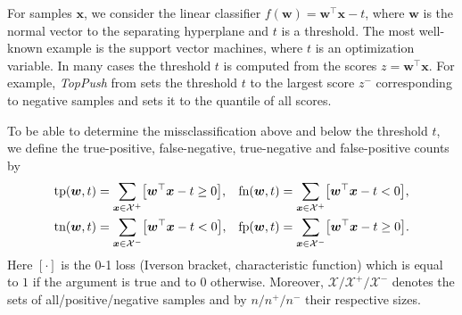 \documentclass[]{interact}
\theoremstyle{plain}%
\theoremstyle{definition}
\theoremstyle{remark}
\let\originalleft\left
\let\originalright\right
\renewcommand{\left}{\mathopen{}\mathclose\bgroup\originalleft}
\renewcommand{\right}{\aftergroup\egroup\originalright}
\newcommand{\toppush}{\emph{TopPush}\xspace}
\newcommand{\tp}{\textnormal{tp}}
\newcommand{\tn}{\textnormal{tn}}
\newcommand{\fp}{\textnormal{fp}}
\newcommand{\fn}{\textnormal{fn}}
\begin{document}
For samples $\bm x$, we consider the linear classifier $f(\bm w)=\bm w^\top \bm x-t$, where $\bm w$ is the normal vector to the separating hyperplane and $t$ is a threshold. The most well-known example is the support vector machines, where $t$ is an optimization variable. In many cases the threshold $t$ is computed from the scores $z=\bm w^\top \bm x$. For example, \toppush from \cite{Li_TopPush} sets the threshold $t$ to the largest score $z^-$ corresponding to negative samples and \cite{Grill_2016} sets it to the quantile of all scores.

To be able to determine the missclassification above and below the threshold $t$, we define the true-positive, false-negative, true-negative and false-positive counts by
\begin{equation}\label{eq:defin_counts}
\aligned
\tp(\bm w,t) & = \sum_{\bm x\in\mathcal X^+}\left[\bm w^\top \bm x-t \ge 0\right], &
\fn(\bm w,t) & = \sum_{\bm x\in\mathcal X^+}\left[\bm w^\top \bm x-t < 0\right], \\
\tn(\bm w,t) & = \sum_{\bm x\in\mathcal X^-}\left[\bm w^\top \bm x-t < 0\right], &
\fp(\bm w,t) & = \sum_{\bm x\in\mathcal X^-}\left[\bm w^\top \bm x-t \ge 0\right].
\endaligned
\end{equation}
Here $[\cdot]$ is the 0-1 loss (Iverson bracket, characteristic function) which is equal to $1$ if the argument is true and to $0$ otherwise. Moreover, $\mathcal{X}/\mathcal{X}^{+}/\mathcal{X}^{-}$ denotes the sets of all/positive/negative samples and by $n/n^{+}/n^{-}$ their respective sizes. 
\end{document}
